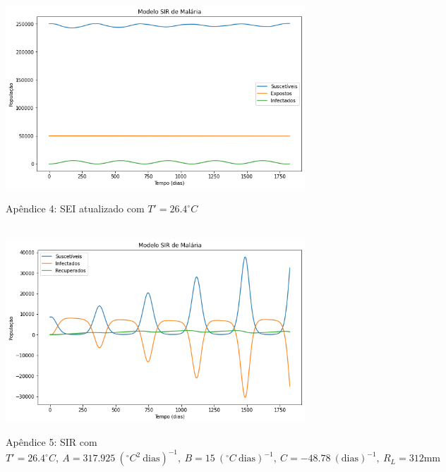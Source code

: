 \documentclass[12pt]{article}
\begin{document}
\begin{figure}[!ht]
        \centering
        \hbox{\hspace{2.0em} \includegraphics[scale=0.55] {SEI_a_correto.png}}
        \caption*{Apêndice 4: SEI atualizado com $T'=26.4^\circ C$}
\end{figure}
\newpage
\begin{figure}[!ht]
        \centering
        \hbox{\hspace{2.0em} \includegraphics[scale=0.55] {SIR_Correcao_b3.png}}
        \caption*{Apêndice 5: SIR com $T'=26.4^\circ C, \ A=317.925 \ (^\circ C^2 \ \text{dias})^{-1}, \ B=15 \ (^\circ C \ \text{dias})^{-1}, \ C=-48.78 \ (\text{dias})^{-1}, \ R_L=312 \text{mm}$}
\end{figure} 
\end{document}
